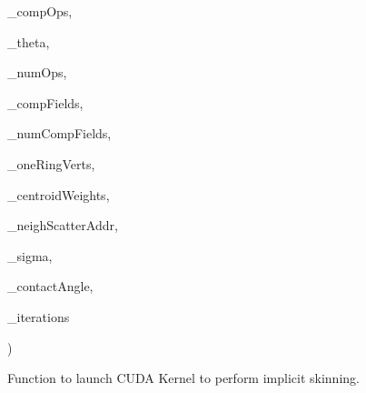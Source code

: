 {\begin{DoxyParamCaption}
\item[{const cuda\+Texture\+Object\+\_\+t $\ast$}]{\+\_\+comp\+Ops, }
\item[{const cuda\+Texture\+Object\+\_\+t $\ast$}]{\+\_\+theta, }
\item[{const int}]{\+\_\+num\+Ops, }
\item[{const {\bf Composed\+Field\+Cuda} $\ast$}]{\+\_\+comp\+Fields, }
\item[{const int}]{\+\_\+num\+Comp\+Fields, }
\item[{const int $\ast$}]{\+\_\+one\+Ring\+Verts, }
\item[{const float $\ast$}]{\+\_\+centroid\+Weights, }
\item[{const int $\ast$}]{\+\_\+neigh\+Scatter\+Addr, }
\item[{const float}]{\+\_\+sigma, }
\item[{const float}]{\+\_\+contact\+Angle, }
\item[{const int}]{\+\_\+iterations}
\end{DoxyParamCaption}
)}\hypertarget{namespaceisgw_acd11ec618e357fefdc8e530211339cdf}{}\label{namespaceisgw_acd11ec618e357fefdc8e530211339cdf}


Function to launch C\+U\+DA Kernel to perform implicit skinning. 


